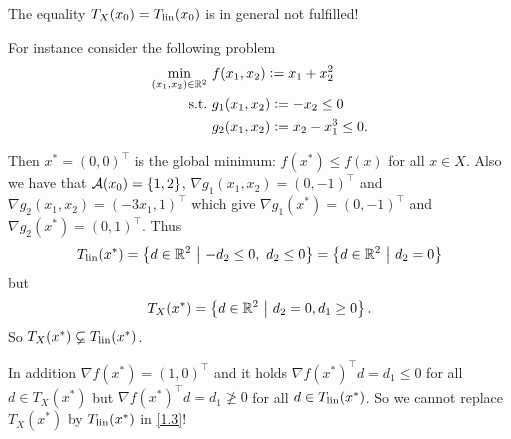 \begin{example}\label{ex1.8}
    The equality \(T_X(x_0) = T_{\operatorname{lin}}(x_0)\) is in general not fulfilled!

    For instance consider the following problem
    \begin{align*}
        \min_{(x_1, x_2) \in \mathbb{R}^2} \ & f(x_1, x_2) \mathrel{\mathop:}= x_1 + x_2^2 \\
        \mathrm{s.t.} \ & g_1(x_1, x_2) \mathrel{\mathop:}= -x_2 \le 0 \\
        & g_2(x_1, x_2) \mathrel{\mathop:}= x_2 - x_1^3 \le 0.
    \end{align*}

    Then \(x^* = (0,0)^\top\) is the global minimum: \(f(x^*) \le f(x)\) for all \(x \in X\). Also we have that \(\mathcal{A}(x_0) = \{1,2\}\), \(\nabla g_1(x_1, x_2) = (0, -1)^\top\) and \(\nabla g_2 (x_1, x_2) = (-3 x_1, 1)^\top\) which give \(\nabla g_1(x^*) = (0, -1)^\top\) and \(\nabla g_2(x^*) = (0,1)^\top\). Thus \[T_{\operatorname{lin}}(x^*) = \left\{ d \in \mathbb{R}^2 \ \middle| \ -d_2 \le 0 ,\ d_2 \le 0 \right\} = \left\{ d \in \mathbb{R}^2 \ \middle| \ d_2 = 0 \right\}\] but \[T_X(x^*) = \left\{ d \in \mathbb{R}^2 \ \middle| \ d_2 = 0, d_1 \ge 0 \right\}.\] So \(T_X(x^*) \varsubsetneq T_{\operatorname{lin}}(x^*)\).

    In addition \(\nabla f(x^*) = (1,0)^\top\) and it holds \(\nabla f(x^*)^\top d = d_1 \le 0\) for all \(d \in T_X(x^*)\) but \(\nabla f(x^*)^\top d = d_1 \ngeq 0\) for all \(d \in T_{\operatorname{lin}}(x^*)\). So we cannot replace \(T_X(x^*)\) by \(T_{\operatorname{lin}}(x^*)\) in \eqref{1.3}!
\end{example}
